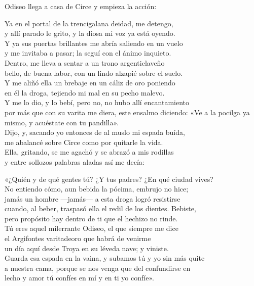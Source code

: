 Odiseo llega a casa de Circe y empieza la acción:

\begin{versocita}
Ya en el portal de la trencigalana deidad, me detengo,\\
y allí parado le grito, y la diosa mi voz ya está oyendo.\\
Y ya sus puertas brillantes me abría saliendo en un vuelo\\
y me invitaba a pasar; la seguí con el ánimo inquieto.\\
Dentro, me lleva a sentar a un trono argenticlaveño\\
bello, de buena labor, con un lindo alzapié sobre el suelo.\\
Y me aliñó ella un brebaje en un cáliz de oro poniendo\\
en él la droga, tejiendo mi mal en su pecho malevo.\\
Y me lo dio, y lo bebí, pero no, no hubo allí encantamiento\\
por más que con su varita me diera, este ensalmo diciendo:
\stanzabreak
«Ve a la pocilga ya mismo, y acuéstate con tu pandilla».\\
Dijo, y, sacando yo entonces de al muslo mi espada buída,\\
me abalancé sobre Circe como por quitarle la vida.\\
Ella, gritando, se me agachó y se abrazó a mis rodillas\\
y entre sollozos palabras aladas así me decía:
\end{versocita}

\begin{versocita}
«¿Quién y de qué gentes tú? ¿Y tus padres? ¿En qué ciudad vives?\\
No entiendo cómo, aun bebida la pócima, embrujo no hice;\\
jamás un hombre ---jamás--- a esta droga logró resistirse\\
cuando, al beber, traspasó ella el redil de los dientes. Bebiste,\\
pero propósito hay dentro de ti que el hechizo no rinde.\\
Tú eres aquel milerrante Odiseo, el que siempre me dice\\
el Argifontes varitadeoro que habrá de venirme\\
un día aquí desde Troya en su léveda nave; y viniste.\\
Guarda esa espada en la vaina, y subamos tú y yo sin más quite\\
a nuestra cama, porque se nos venga que del confundirse en\\
lecho y amor tú confíes en mí y en ti yo confíe».
\end{versocita}

